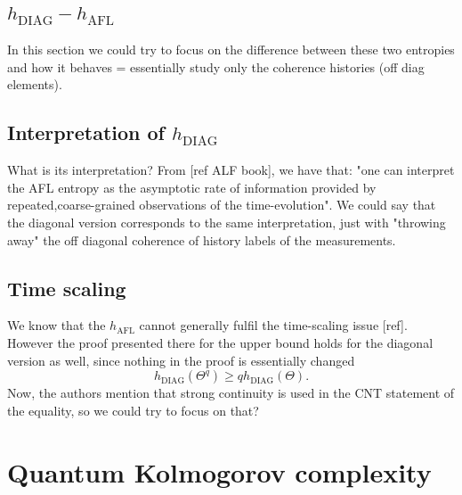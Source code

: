 \documentclass{article}
\newcommand{\afl}{h_{\text{AFL}}}
\newcommand{\diag}{h_{\text{DIAG}}}
\begin{document}
\subsection{$\diag - \afl$}
In this section we could try to focus on the difference between these two entropies and how it behaves = essentially study only the coherence histories (off diag elements). 
\subsection{Interpretation of $\diag$}
What is its interpretation? From [ref ALF book], we have that:  "one can interpret the AFL entropy as the asymptotic rate of
information provided by repeated,coarse-grained observations of the time-evolution". We could say that the diagonal version corresponds to the same interpretation, just with "throwing away" the off diagonal coherence of history labels of the measurements. 
\subsection{Time scaling}
We know that the $\afl$ cannot generally fulfil the time-scaling issue [ref]. However the proof presented there for the upper bound holds for the diagonal version as well, since nothing in the proof is essentially changed
\begin{equation}
    \diag(\Theta^q) \geq q\diag(\Theta).
\end{equation}
Now, the authors mention that strong continuity is used in the CNT statement of the equality, so we could try to focus on that?


\section{Quantum Kolmogorov complexity}
\end{document}

